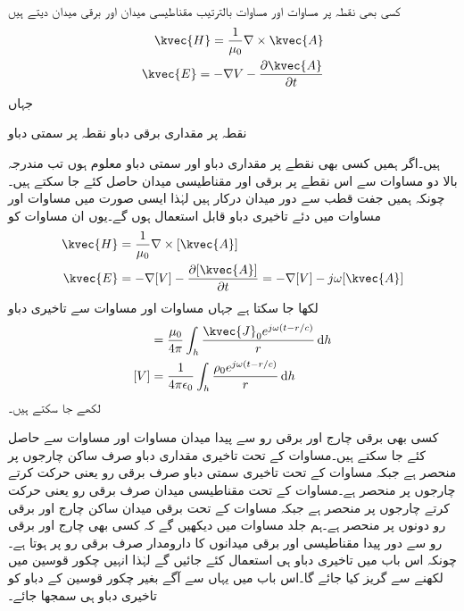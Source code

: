 کسی بھی نقطہ  پر مساوات   اور مساوات  بالترتیب مقناطیسی میدان اور برقی میدان دیتے ہیں
\begin{align}
\kvec{H}=\frac{1}{\mu_0}\nabla \times \kvec{A} \\
\kvec{E}=-\nabla V-\frac{\partial \kvec{A}}{\partial t}
\end{align}
جہاں
\begin{description}
 نقطہ  پر مقداری برقی دباو
 نقطہ  پر سمتی دباو
\end{description}
ہیں۔اگر ہمیں کسی بھی نقطے پر مقداری دباو  اور سمتی دباو  معلوم ہوں تب مندرجہ بالا دو مساوات سے اس نقطے پر برقی اور مقناطیسی میدان حاصل کئے جا سکتے ہیں۔چونکہ ہمیں  جفت قطب سے دور میدان درکار ہیں لہٰذا ایسی صورت میں مساوات  اور مساوات  میں دئے تاخیری دباو قابل استعمال ہوں گے۔یوں ان مساوات کو
\begin{align}
\kvec{H}&=\frac{1}{\mu_0}\nabla \times [\kvec{A}] \label{مساوات_اینٹینا_عمومی_مقناطیسی}\\
\kvec{E}&=-\nabla [V]-\frac{\partial [\kvec{A}]}{\partial t}=-\nabla [V]-j \omega [\kvec{A}]\label{مساوات_اینٹینا_عمومی_برقی}
\end{align}
لکھا جا سکتا ہے جہاں مساوات  اور مساوات  سے تاخیری دباو
\begin{align}
[\kvec{A}]&=\frac{\mu_0}{4\pi} \int_h \frac{\kvec{J}_0 e^{j \omega(t-r/c)}}{r} \dif h \label{مساوات_اینٹینا_عمومی_سمتی_دباو}\\
[V]&=\frac{1}{4\pi\epsilon_0}\int_h \frac{\rho_0 e^{j\omega(t-r/c)}}{r} \dif h\label{مساوات_اینٹینا_عمومی_مقداری_دباو}
\end{align}
لکھے جا سکتے ہیں۔

کسی بھی برقی چارج اور برقی رو سے پیدا میدان مساوات  اور مساوات  سے حاصل کئے جا سکتے ہیں۔مساوات  کے تحت تاخیری مقداری دباو  صرف ساکن چارجوں پر منحصر ہے جبکہ مساوات  کے تحت  تاخیری سمتی دباو  صرف برقی رو یعنی حرکت کرتے چارجوں پر منحصر ہے۔مساوات  کے تحت مقناطیسی میدان  صرف برقی رو یعنی حرکت کرتے چارجوں پر منحصر ہے جبکہ مساوات  کے تحت برقی میدان  ساکن چارج اور برقی رو دونوں پر منحصر ہے۔ہم جلد مساوات  میں دیکھیں گے کہ کسی بھی چارج اور برقی رو سے  دور پیدا مقناطیسی اور برقی میدانوں کا دارومدار صرف برقی رو پر ہوتا ہے۔ چونکہ اس باب میں تاخیری دباو ہی استعمال کئے جائیں گے لہٰذا انہیں چکور قوسین میں لکھنے سے گریز کیا جائے گا۔اس باب میں یہاں سے آگے بغیر چکور قوسین کے دباو کو تاخیری دباو ہی سمجھا جائے۔


